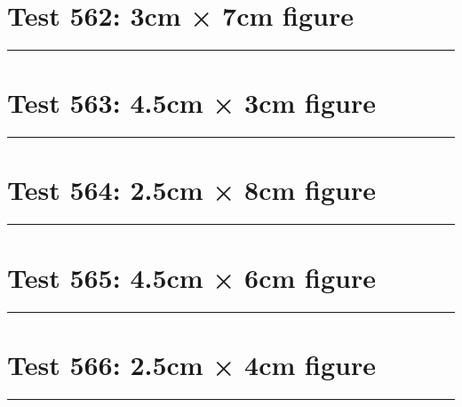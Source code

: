 \documentclass[a4paper,11pt]{article}
\begin{document}
\section*{Test 562: 3cm × 7cm figure}
\begin{swarmwrap}%
  \begin{minipage}[t]{3cm}
    \centering
    \rule{\linewidth}{7cm}
  \end{minipage}%
\end{swarmwrap}%
\swarmwrapnext
\lipsum[17]
\lipsum[18]
\lipsum[19]
\lipsum[20]
\section*{Test 563: 4.5cm × 3cm figure}
\begin{swarmwrap}%
  \begin{minipage}[t]{4cm}
    \centering
    \rule{\linewidth}{3cm}
  \end{minipage}%
\end{swarmwrap}%
\swarmwrapnext
\lipsum[80]
\lipsum[81]
\lipsum[82]
\lipsum[83]
\lipsum[84]
\lipsum[85]
\section*{Test 564: 2.5cm × 8cm figure}
\begin{swarmwrap}%
  \begin{minipage}[t]{2cm}
    \centering
    \rule{\linewidth}{8cm}
  \end{minipage}%
\end{swarmwrap}%
\swarmwrapnext
\lipsum[32]
\lipsum[33]
\lipsum[34]
\lipsum[35]
\lipsum[36]
\section*{Test 565: 4.5cm × 6cm figure}
\begin{swarmwrap}%
  \begin{minipage}[t]{4cm}
    \centering
    \rule{\linewidth}{6cm}
  \end{minipage}%
\end{swarmwrap}%
\swarmwrapnext
\lipsum[58]
\lipsum[59]
\lipsum[60]
\lipsum[61]
\lipsum[62]
\section*{Test 566: 2.5cm × 4cm figure}
\begin{swarmwrap}%
  \begin{minipage}[t]{2cm}
    \centering
    \rule{\linewidth}{4cm}
  \end{minipage}%
\end{swarmwrap}%
\swarmwrapnext
\lipsum[41]
\lipsum[42]
\lipsum[43]
\lipsum[44]
\lipsum[45]
\lipsum[46]
\end{document}
